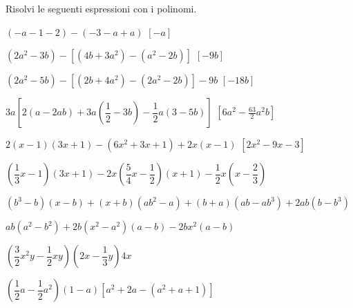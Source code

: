 \begin{esercizio}[\Ast]
\label{ese:10.21}
Risolvi le seguenti espressioni con i polinomi.
 \begin{enumeratea}
 \item $(-a-1-2)-(-3-a+a)$
  \hfill $\left[-a\right]$
 \item $\left(2a^{2}-3b\right)-\left[\left(4b+3a^{2}\right)-
        \left(a^{2}-2b\right)\right]$
  \hfill $\left[-9b\right]$
 \item $\left(2a^{2}-5b\right)-\left[\left(2b+4a^{2}\right)-
        \left(2a^{2}-2b\right)\right]-9b$
  \hfill $\left[-18b\right]$
 \item $3a\left[2(a-2{ab})+3a\left(\dfrac{1}{2}-3b\right)-
        \dfrac{1}{2}a(3-5b)\right]$
  \hfill $\left[6a^{2}-\frac{63}{2}a^{2}b\right]$
 \item $2(x-1)(3x+1)-\left(6x^{2}+3x+1\right)+2x(x-1)$
  \hfill $\left[2x^2-9x-3\right]$
 \item 
$\left(\dfrac{1}{3}x-1\right)(3x+1)-2x\left(\dfrac{5}{4}x-\dfrac{1}{2}
\right)(x+1)-\dfrac{1}{2}x\left(x-\dfrac{2}{3}\right)$
 \item 
$\left(b^{3}-b\right)(x-b)+(x+b)\left(ab^{2}-a\right)+(b+a)\left(ab-ab^{3}
\right)+2ab\left(b-b^{3}\right)$
 \item $ab\left(a^{2}-b^{2}\right)+2b\left(x^{2}-a^{2}\right)(a-b)-2bx^{2}(a-b)$
 \item 
$\left(\dfrac{3}{2}x^{2}y-\dfrac{1}{2}{xy}\right)\left(2x-\dfrac{1}{3}
y\right)4x$
 \item 
$\left(\dfrac{1}{2}a-\dfrac{1}{2}a^{2}\right)(1-a)\left[a^{2}+2a-\left(a^{2}
+a+1\right)\right]$
 \end{enumeratea}
\end{esercizio}

